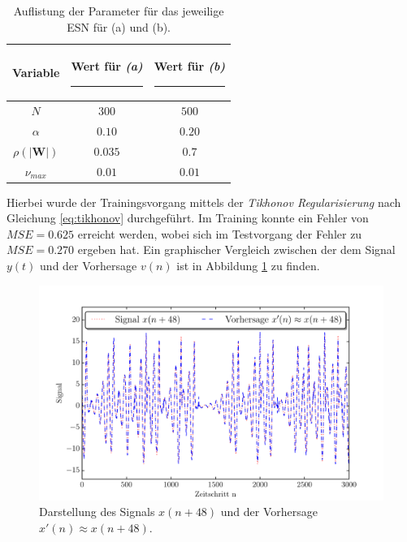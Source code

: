 \begin{table}[H]
	\centering
	\captionsetup{width=0.9\linewidth}
		\begin{tabular}{|c|c|c|}
		\rule[-1ex]{0pt}{3.5ex} Variable & \hspace{4ex} Wert für \textit{(a)} \rule[-1ex]{4ex}{0pt} & \hspace{4ex} Wert für \textit{(b)} \rule[-1ex]{4ex}{0pt}\\ 
		\hline \hline 
		\rule[-1ex]{0pt}{3.5ex} $N$ & $300$ & $500$ \\ 
		\hline 
		\rule[-1ex]{0pt}{3.5ex} $\alpha$ & $0.10$ & $0.20$ \\ 
		\hline 
		\rule[-1ex]{0pt}{3.5ex} $\rho(|\mathbf{W}|)$ & $0.035$ & $0.7$\\ 
		\hline 
		\rule[-1ex]{0pt}{3.5ex} $\nu_{max}$ & $0.01$ & $0.01$\\ 
		\hline 
	\end{tabular} 
	\caption{Auflistung der Parameter für das jeweilige \textsc{ESN} für (a) und (b).}
	\label{tab:application_roessler}
\end{table}

Hierbei wurde der Trainingsvorgang mittels der \textit{Tikhonov Regularisierung} nach Gleichung \ref{eq:tikhonov} durchgeführt. Im Training konnte ein Fehler von $MSE = 0.625$ erreicht werden, wobei sich im Testvorgang der Fehler zu $MSE = 0.270$ ergeben hat. Ein graphischer Vergleich zwischen der dem Signal $y(t)$ und der Vorhersage $v(n)$ ist in Abbildung \ref{fig:application_roessler_a} zu finden.

\vspace{-4ex}
\begin{figure}[H]
    \centering
    \includegraphics[width = 0.9 \textwidth]{figures/roessler_pred50.pdf}
    \caption{Darstellung des Signals $x(n+48)$ und der Vorhersage $x'(n) \approx x(n+48)$.}
    \label{fig:application_roessler_a}
\end{figure}



